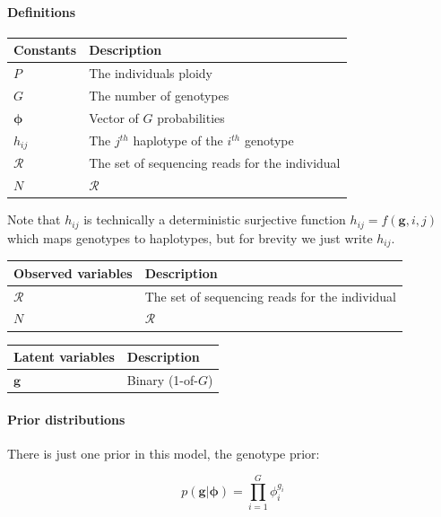 \documentclass{article}
\begin{document}
\paragraph{Definitions}

\begin{center}
\begin{tabular}{ll}
Constants & Description \\
\hline
$P$ & The individuals ploidy \\
$G$ & The number of genotypes \\
$\boldsymbol{\phi}$ & Vector of $G$ probabilities \\
$h_{ij}$ & The $j^{th}$ haplotype of the $i^{th}$ genotype \\
$\mathcal{R}$ & The set of sequencing reads for the individual \\
$N$ & $\mathcal{R}$ \\
\hline
\end{tabular}
\end{center}

Note that $h_{ij}$ is technically a deterministic surjective function $h_{ij} = f(\boldsymbol{g}, i, j)$ which maps genotypes to haplotypes, but for brevity we just write $h_{ij}$.

\begin{center}
\begin{tabular}{ll}
Observed variables & Description \\
\hline
$\mathcal{R}$ & The set of sequencing reads for the individual \\
$N$ & $\mathcal{R}$ \\
\hline
\end{tabular}
\end{center}

\begin{center}
\begin{tabular}{ll}
Latent variables & Description \\
\hline
$\boldsymbol{g}$ & Binary (1-of-$G$) \\
\hline
\end{tabular}
\end{center}

\paragraph{Prior distributions}

There is just one prior in this model, the genotype prior:

\begin{equation}
    p(\boldsymbol{g} | \boldsymbol{\phi}) = \prod_{i = 1}^G \phi_i^{g_i}
\end{equation}
\end{document}
